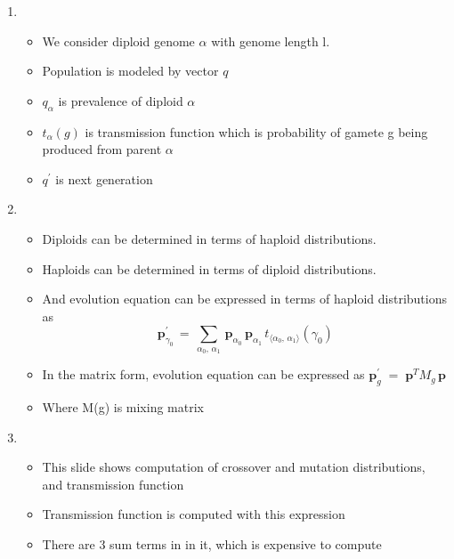 \documentclass{article}
\begin{document}
\begin{enumerate}
\item
  \begin{itemize}
  \item We consider diploid genome $\alpha$ with genome length l.
  \item Population is modeled by vector $q$
  \item $q_\alpha$ is prevalence of diploid $\alpha$
  \item $t_{\alpha}(g)$ is transmission function which is probability
    of gamete g being produced from parent $\alpha$
  \item $q^\prime$ is next generation
  \end{itemize}
    
\item
  \begin{itemize}
  \item Diploids can be determined in terms of haploid
    distributions.
  \item Haploids can be determined in terms of diploid
    distributions.
  \item And evolution equation can be expressed in terms of haploid
    distributions as 
    \[\bm{p}_{\gamma_0}^{\prime} \,=\, \sum_{\alpha_0, \, \alpha_1} \, \bm{p}_{\alpha_0} \, \bm{p}_{\alpha_1} \,
	  t_{\langle \alpha_0, \,\alpha_1 \rangle}(\gamma_0) \]
	  
  \item In the matrix form, evolution equation can be expressed as $\bm{p}_g^\prime \; = \; \bm{p}^T M_g \, \bm{p}$
  \item Where M(g) is mixing matrix
  \end{itemize}
    
\item
  \begin{itemize}
  \item This slide shows computation of crossover and mutation
    distributions, and transmission function  
  \item Transmission function is computed with this expression
  \item There are 3 sum terms in in it, which is expensive to compute
  \end{itemize}
    

\end{enumerate}
\end{document}
